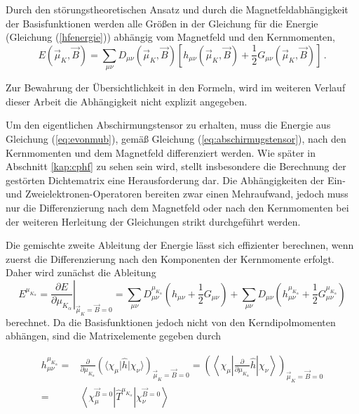   	Durch den störungstheoretischen Ansatz und durch die Magnetfeldabhängigkeit der Basisfunktionen werden alle Größen in der Gleichung für die Energie (Gleichung (\ref{hfenergie})) abhängig vom Magnetfeld und den Kernmomenten, 
  	\begin{equation}\label{eq:evonmub}
  	  E(\vec{\mu}_K,\vec{B})=\sum_{\mu\nu}D_{\mu\nu}(\vec{\mu}_K,\vec{B})\left[h_{\mu\nu}(\vec{\mu}_K,\vec{B})+\frac{1}{2}G_{\mu\nu}(\vec{\mu}_K,\vec{B})\right]\, .
	\end{equation} 
	 	 
  	Zur Bewahrung der Übersichtlichkeit in den Formeln, wird im weiteren Verlauf dieser Arbeit die Abhängigkeit nicht explizit angegeben.
  	
  	Um den eigentlichen Abschirmungstensor zu erhalten, muss die Energie aus Gleichung (\ref{eq:evonmub}), gemäß Gleichung (\ref{eq:abschirmugstensor}), nach den Kernmomenten und dem Magnetfeld differenziert werden. Wie später in Abschnitt \ref{kap:cphf} zu sehen sein wird, stellt insbesondere die Berechnung der gestörten Dichtematrix eine Herausforderung dar. Die Abhängigkeiten der Ein- und Zweielektronen-Operatoren bereiten zwar einen Mehraufwand, jedoch muss nur die Differenzierung nach dem Magnetfeld oder nach den Kernmomenten bei der weiteren Herleitung der Gleichungen strikt durchgeführt werden.
  	 
  	Die gemischte zweite Ableitung der Energie lässt sich effizienter berechnen, wenn zuerst die Differenzierung nach den Komponenten der Kernmomente erfolgt.\supercite{baron1991} Daher wird zunächst die Ableitung  	
  	\begin{equation}\label{eq:enachmu}
  	  E^{\mu_{K_\alpha}}=\left.\frac{\partial E}{\partial\mu_{K_\alpha}}\right|_{\vec{\mu}_K=\vec{B}=0}=\sum_{\mu\nu}D_{\mu\nu}^{\mu_{K_\alpha}}\left(h_{\mu\nu}+\frac{1}{2}G_{\mu\nu}\right)+\sum_{\mu\nu}D_{\mu\nu}\left(h_{\mu\nu}^{\mu_{K_\alpha}}+\frac{1}{2}G_{\mu\nu}^{\mu_{K_\alpha}}\right)
  	\end{equation}
     berechnet. Da die Basisfunktionen jedoch nicht von den Kerndipolmomenten abhängen, sind die Matrixelemente gegeben durch
     
     \begin{equation}\label{eq:hmukelemente}
     \begin{aligned}
       h_{\mu\nu}^{\mu_{K_\alpha}}=&\frac{\partial}{\partial \mu_{K_\alpha}}\left(\langle\chi_\mu\vert\hat{h}\vert\chi_\nu\rangle\right)_{\vec{\mu}_K=\vec{B}=0}=\left(\left\langle\chi_\mu\left\vert\frac{\partial}{\partial \mu_{K_\alpha}}\hat{h}\right\vert\chi_\nu\right\rangle\right)_{\vec{\mu}_K=\vec{B}=0}\\
       =&\left\langle\chi_\mu^{\vec{B}=0}\left\vert\hat{T}^{\mu_{K_\alpha}}\right\vert\chi_\nu^{\vec{B}=0}\right\rangle
     \end{aligned}
     \end{equation}
     
